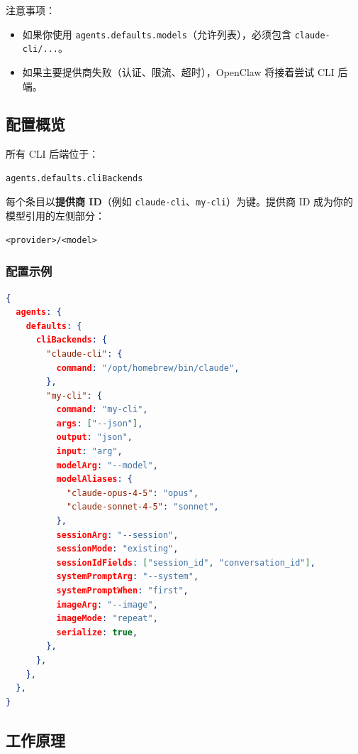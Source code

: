 注意事项：

\begin{itemize}
  \item 如果你使用 \texttt{agents.defaults.models}（允许列表），必须包含 \texttt{claude-cli/...}。
  \item 如果主要提供商失败（认证、限流、超时），OpenClaw 将接着尝试 CLI 后端。
\end{itemize}


\subsection{配置概览}


所有 CLI 后端位于：

\begin{lstlisting}
agents.defaults.cliBackends
\end{lstlisting}


每个条目以\textbf{提供商 ID}（例如 \texttt{claude-cli}、\texttt{my-cli}）为键。提供商 ID 成为你的模型引用的左侧部分：

\begin{lstlisting}
<provider>/<model>
\end{lstlisting}


\subsubsection{配置示例}


\begin{lstlisting}[language=json]
{
  agents: {
    defaults: {
      cliBackends: {
        "claude-cli": {
          command: "/opt/homebrew/bin/claude",
        },
        "my-cli": {
          command: "my-cli",
          args: ["--json"],
          output: "json",
          input: "arg",
          modelArg: "--model",
          modelAliases: {
            "claude-opus-4-5": "opus",
            "claude-sonnet-4-5": "sonnet",
          },
          sessionArg: "--session",
          sessionMode: "existing",
          sessionIdFields: ["session_id", "conversation_id"],
          systemPromptArg: "--system",
          systemPromptWhen: "first",
          imageArg: "--image",
          imageMode: "repeat",
          serialize: true,
        },
      },
    },
  },
}
\end{lstlisting}


\subsection{工作原理}


